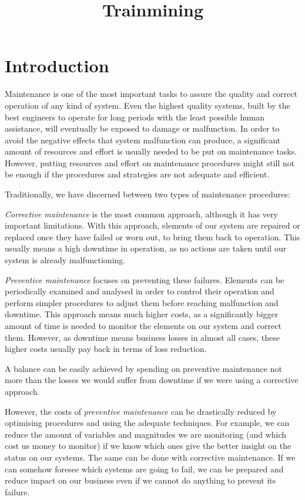 \documentclass[a4paper,10pt]{article}
\title{Trainmining}
\author{}
\begin{document}
\maketitle

\begin{abstract}

\end{abstract}

\section{Introduction}\label{sec:context}
Maintenance is one of the most important tasks to assure the quality and correct operation of any kind of system. Even the highest quality systems, built by the best engineers to operate for long periods with the least possible human assistance, will eventually be exposed to damage or malfunction. In order to avoid the negative effects that system malfunction can produce, a significant amount of resources and effort is usually needed to be put on maintenance tasks. However, putting resources and effort on maintenance procedures might still not be enough if the procedures and strategies are not adequate and efficient.

Traditionally, we have discerned between two types of maintenance procedures:

\emph{Corrective maintenance} is the most common approach, although it has very important limitations. With this approach, elements of our system are repaired or replaced once they have failed or worn out, to bring them back to operation. This usually means a high downtime in operation, as no actions are taken until our system is already malfunctioning.

\emph{Preventive maintenance} focuses on preventing these failures. Elements can be periodically examined and analysed in order to control their operation and perform simpler procedures to adjust them before reaching malfunction and downtime. This approach means much higher costs, as a significantly bigger amount of time is needed to monitor the elements on our system and correct them. However, as downtime means business losses in almost all cases, these higher costs usually pay back in terms of loss reduction.

A balance can be easily achieved by spending on preventive maintenance not more than the losses we would suffer from downtime if we were using a corrective approach.

However, the costs of \emph{preventive maintenance} can be drastically reduced by optimising procedures and using the adequate techniques. For example, we can reduce the amount of variables and magnitudes we are monitoring (and which cost us money to monitor) if we know which ones give the better insight on the status on our systems. The same can be done with corrective maintenance. If we can somehow foresee which systems are going to fail, we can be prepared and reduce impact on our business even if we cannot do anything to prevent its failure.
\end{document}
